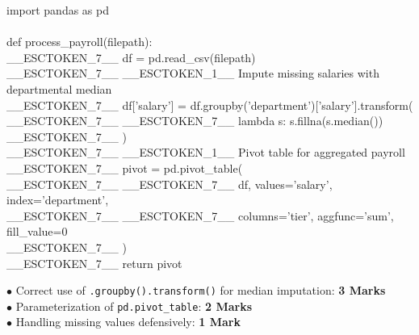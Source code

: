 \begin{solutionbox}
\begin{pycode}
import pandas as pd\\
~\\
def process\_payroll(filepath):\\
\_\_ESCTOKEN\_7\_\_ df = pd.read\_csv(filepath)\\
\_\_ESCTOKEN\_7\_\_ \_\_ESCTOKEN\_1\_\_ Impute missing salaries with departmental median\\
\_\_ESCTOKEN\_7\_\_ df['salary'] = df.groupby('department')['salary'].transform(\\
\_\_ESCTOKEN\_7\_\_ \_\_ESCTOKEN\_7\_\_ lambda s: s.fillna(s.median())\\
\_\_ESCTOKEN\_7\_\_ )\\
\_\_ESCTOKEN\_7\_\_ \_\_ESCTOKEN\_1\_\_ Pivot table for aggregated payroll\\
\_\_ESCTOKEN\_7\_\_ pivot = pd.pivot\_table(\\
\_\_ESCTOKEN\_7\_\_ \_\_ESCTOKEN\_7\_\_ df, values='salary', index='department',\\
\_\_ESCTOKEN\_7\_\_ \_\_ESCTOKEN\_7\_\_ columns='tier', aggfunc='sum', fill\_value=0\\
\_\_ESCTOKEN\_7\_\_ )\\
\_\_ESCTOKEN\_7\_\_ return pivot
\end{pycode}
\begin{markingrubric}
$\bullet$ Correct use of \texttt{.groupby().transform()} for median imputation: \textbf{3 Marks}\\
$\bullet$ Parameterization of \texttt{pd.pivot\_table}: \textbf{2 Marks}\\
$\bullet$ Handling missing values defensively: \textbf{1 Mark}
\end{markingrubric}
\end{solutionbox}

